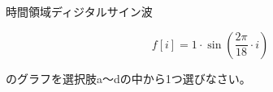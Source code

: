 時間領域ディジタルサイン波 

\[
f[i] = 1 \cdot \sin \left ( \frac{2 \pi}{18}  \cdot i \right )
\]

\noindent のグラフを選択肢a〜dの中から1つ選びなさい。
